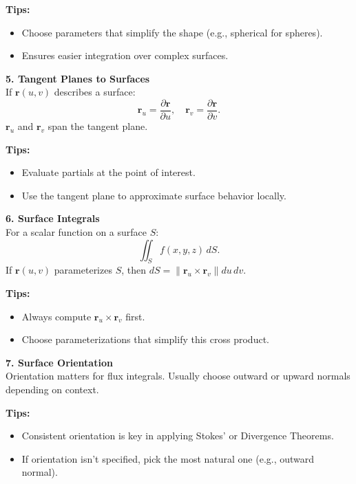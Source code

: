 \documentclass[9pt]{article}
\begin{document}
\begin{multicols}{2}
\begin{tcolorbox}[title=, colframe=brightyellow]
\textbf{Tips:}
\begin{itemize}
    \item Choose parameters that simplify the shape (e.g., spherical for spheres).
    \item Ensures easier integration over complex surfaces.
\end{itemize}
\end{tcolorbox}

\begin{tcolorbox}[title=, colframe=brightblue]
\textbf{5. Tangent Planes to Surfaces}\\
If $\mathbf{r}(u,v)$ describes a surface:
\[
\mathbf{r}_u=\frac{\partial \mathbf{r}}{\partial u},\quad \mathbf{r}_v=\frac{\partial \mathbf{r}}{\partial v}.
\]
$\mathbf{r}_u$ and $\mathbf{r}_v$ span the tangent plane.

\textbf{Tips:}
\begin{itemize}
    \item Evaluate partials at the point of interest.
    \item Use the tangent plane to approximate surface behavior locally.
\end{itemize}
\end{tcolorbox}

\begin{tcolorbox}[title=, colframe=brightgreen]
\textbf{6. Surface Integrals}\\
For a scalar function on a surface $S$:
\[
\iint_S f(x,y,z)\,dS.
\]
If $\mathbf{r}(u,v)$ parameterizes $S$, then $dS=\|\mathbf{r}_u\times\mathbf{r}_v\|du\,dv$.

\textbf{Tips:}
\begin{itemize}
    \item Always compute $\mathbf{r}_u\times \mathbf{r}_v$ first.
    \item Choose parameterizations that simplify this cross product.
\end{itemize}
\end{tcolorbox}

\begin{tcolorbox}[title=, colframe=brightpink]
\textbf{7. Surface Orientation}\\
Orientation matters for flux integrals. Usually choose outward or upward normals depending on context.

\textbf{Tips:}
\begin{itemize}
    \item Consistent orientation is key in applying Stokes’ or Divergence Theorems.
    \item If orientation isn’t specified, pick the most natural one (e.g., outward normal).
\end{itemize}
\end{tcolorbox}


\end{multicols}
\end{document}
